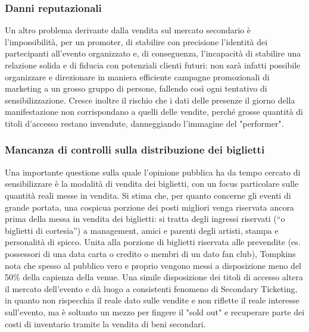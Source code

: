 \subsubsection{Danni reputazionali}
Un altro problema derivante dalla vendita sul mercato secondario è l'impossibilità, per un promoter, di stabilire con precisione l'identità dei partecipanti all'evento organizzato e, di conseguenza, l'incapacità di stabilire una relazione solida e di fiducia con potenziali clienti futuri: non sarà infatti possibile organizzare e direzionare in maniera efficiente campagne promozionali di marketing a un grosso gruppo di persone, fallendo così ogni tentativo di sensibilizzazione.
Cresce inoltre il rischio che i dati delle presenze il giorno della manifestazione non corrispondano a quelli delle vendite, perché grosse quantità di titoli d'accesso restano invendute, danneggiando l'immagine del "performer".  
\subsubsection{Mancanza di controlli sulla distribuzione dei biglietti}
Una importante questione sulla quale l'opinione pubblica ha da tempo cercato di sensibilizzare è la modalità di vendita dei biglietti, con un focus particolare sulle quantità reali messe in vendita.
Si stima che, per quanto concerne gli eventi di grande portata, una cospicua porzione dei posti migliori venga riservata ancora prima della messa in vendita dei biglietti: si tratta degli ingressi riservati ("`o biglietti di cortesia"') a management, amici e parenti degli artisti, stampa e personalità di spicco. Unita alla porzione di biglietti riservata alle prevendite (es. possessori di una data carta o credito o membri di un dato fan club), Tompkins \cite{tompkins2018ticket} nota che spesso al pubblico vero e proprio vengono messi a disposizione meno del 50\% della capienza della venue. Una simile disposizione dei titoli di accesso altera il mercato dell'evento e dà luogo a consistenti fenomeno di Secondary Ticketing, in quanto non rispecchia il reale dato sulle vendite e non riflette il reale interesse sull'evento, ma è soltanto un mezzo per fingere il "sold out" e recuperare parte dei costi di inventario tramite la vendita di beni secondari.  
 

